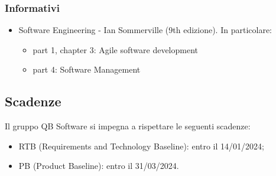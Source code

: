     \subsubsection{Informativi}
    \begin{itemize}
        \item Software Engineering - Ian Sommerville (9th edizione). In particolare:
        \begin{itemize}
            \item part 1, chapter 3: Agile software development
            \item part 4: Software Management
        \end{itemize}
    \end{itemize}

    \subsection{Scadenze}
    Il gruppo QB Software si impegna a rispettare le seguenti scadenze: 
    \begin{itemize}
        \item RTB (Requirements and Technology Baseline): entro il 14/01/2024;
        \item PB (Product Baseline): entro il 31/03/2024.
    \end{itemize}